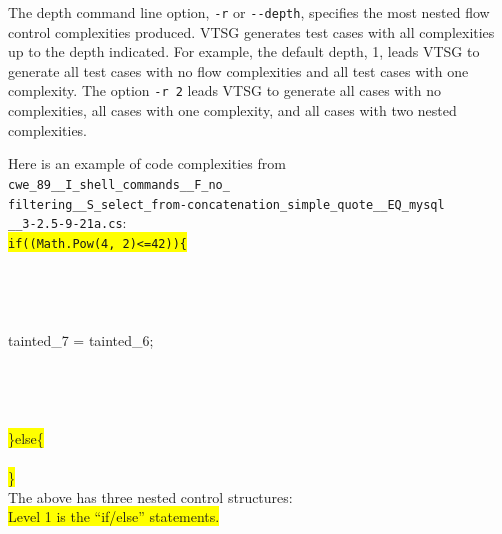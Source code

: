 \label{sec:depth of complexities}
The depth command line option, \verb|-r| or \verb|--depth|, specifies the most nested
flow control complexities produced.  VTSG generates test cases with all complexities
up to the depth indicated.  For example, the default depth, 1, leads VTSG to generate
all test cases with no flow complexities and all test cases with one complexity.
The option \verb|-r 2| leads VTSG to generate all cases with no complexities, all
cases with one complexity, and all cases with two nested complexities.

Here is an example of code complexities from \verb|cwe_89__I_shell_commands__F_no_|\\
\verb|filtering__S_select_from-concatenation_simple_quote__EQ_mysql| \\
\verb|__3-2.5-9-21a.cs|: \\
{\texttt
{\colorbox{yellow}{if((Math.Pow(4, 2)<=42))\{}}\\
\\
\\
\\
\\
\hspace*{6em}tainted\_7 = tainted\_6;\\
\\
\\
\\
\\
{\colorbox{yellow}{\}else\{}}\\
\\
{\colorbox{yellow}{\}}}
}
\\
The above has three nested control structures:\\
{\colorbox{yellow}{Level 1 is the ``if/else'' statements.}}\\
\\

